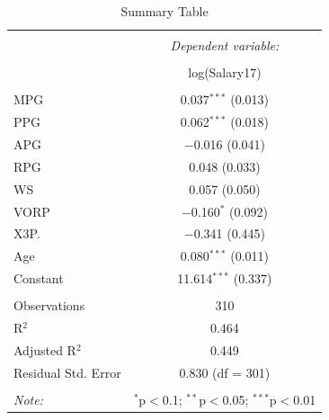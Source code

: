\documentclass[12pt,english]{article}
\begin{document}
\begin{table}[!htbp] \centering 
  \caption{Summary Table} 
  \label{Table1} 
\begin{tabular}{@{\extracolsep{5pt}}lc} 
\\[-1.8ex]\hline 
\hline \\[-1.8ex] 
 & \multicolumn{1}{c}{\textit{Dependent variable:}} \\ 
\cline{2-2} 
\\[-1.8ex] & log(Salary17) \\ 
\hline \\[-1.8ex] 
 MPG & 0.037$^{***}$ (0.013) \\ 
  PPG & 0.062$^{***}$ (0.018) \\ 
  APG & $-$0.016 (0.041) \\ 
  RPG & 0.048 (0.033) \\ 
  WS & 0.057 (0.050) \\ 
  VORP & $-$0.160$^{*}$ (0.092) \\ 
  X3P. & $-$0.341 (0.445) \\ 
  Age & 0.080$^{***}$ (0.011) \\ 
  Constant & 11.614$^{***}$ (0.337) \\ 
 \hline \\[-1.8ex] 
Observations & 310 \\ 
R$^{2}$ & 0.464 \\ 
Adjusted R$^{2}$ & 0.449 \\ 
Residual Std. Error & 0.830 (df = 301) \\ 
\hline 
\hline \\[-1.8ex] 
\textit{Note:}  & \multicolumn{1}{r}{$^{*}$p$<$0.1; $^{**}$p$<$0.05; $^{***}$p$<$0.01} \\ 
\end{tabular} 
\end{table} 

\newpage


\end{document}
